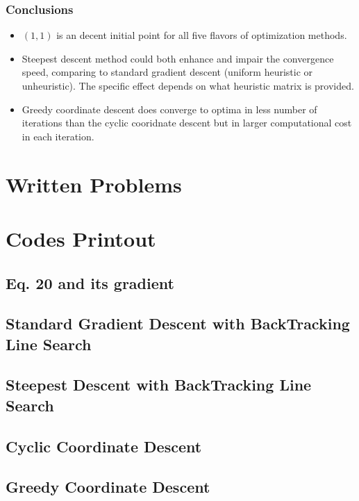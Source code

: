 \documentclass[11pt,a4paper]{article}
\begin{document}
\newpage
\subsubsection{Conclusions}
\begin{itemize}
    \item $(1, 1)$ is an decent initial point for all five
        flavors of optimization methods.
    \item Steepest descent method could both enhance and impair the convergence
        speed, comparing to standard gradient descent (uniform heuristic or
        unheuristic). The specific effect depends on what heuristic matrix is provided. 
    \item Greedy coordinate descent does converge to optima in less number of
        iterations than the cyclic cooridnate descent but in larger
        computational cost in each iteration.
\end{itemize}

\newpage
\section{Written Problems}


\newpage
\appendix
\section{Codes Printout}

\subsection{Eq. 20 and its gradient}



\newpage
\subsection{Standard Gradient Descent with BackTracking Line Search}

\newpage

\subsection{Steepest Descent with BackTracking Line Search}

\newpage

\subsection{Cyclic Coordinate Descent}

\newpage

\subsection{Greedy Coordinate Descent}

\newpage
\end{document}
